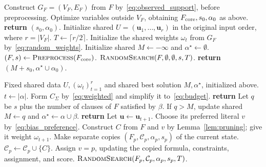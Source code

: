 \documentclass[11pt,a4paper]{article}
\theoremstyle{definition}
\theoremstyle{remark}
\begin{document}
\begin{algorithm}[H]
\caption{\textnormal{\textsc{RandomFormula}}$(F)$}\label{alg:weighted}
\begin{algorithmic}[1]
\STATE Construct $G_F=(V_F,E_F)$ from $F$ by~\eqref{eq:observed_support}, before preprocessing.
\STATE Optimize variables outside $V_F$, obtaining $F_{\rm core},s_0,\alpha_0$ as above.
  \STATE \textbf{return} $(s_0,\alpha_0)$.
\ENDIF
\STATE Initialize shared $U=(\mathbf u_1,\ldots,\mathbf u_r)$ in the original input order, where $r=|V_F|$.
\STATE $T\gets\lceil r/2\rceil$.
\STATE Initialize the shared weights $\omega_t$ from $G_F$ by~\eqref{eq:random_weights}.
\STATE Initialize shared $M\gets-\infty$ and $\alpha^\star\gets\emptyset$.
\STATE $(F,s)\gets\textnormal{\textsc{Preprocess}}(F_{\rm core})$.
\STATE $\textnormal{\textsc{RandomSearch}}(F,\emptyset,\emptyset,s,T)$.
\STATE \textbf{return} $(M+s_0,\alpha^\star\cup\alpha_0)$.
\end{algorithmic}
\end{algorithm}

\begin{algorithm}[H]
\caption{\textnormal{\textsc{RandomSearch}}$(F,\mathcal C,\alpha,s,T)$}
\label{alg:random_search}
\begin{algorithmic}[1]
\REQUIRE Fixed shared data $U,(\omega_t)_{t=1}^r$ and shared best solution $M,\alpha^\star$, initialized above.
\STATE $t\gets|\alpha|$.
\STATE Form $C_\Sigma$ by~\eqref{eq:weighted} and simplify it to~\eqref{eq:budget}.
  \STATE \textbf{return}
\ENDIF
{}
    \STATE Let $q$ be $s$ plus the number of clauses of $F$ satisfied by $\beta$.
    \STATE If $q>M$, update shared $M\gets q$ and $\alpha^\star\gets\alpha\cup\beta$.
  \ENDFOR
  \STATE \textbf{return}
\ENDIF
\STATE Let $\mathbf u\gets\mathbf u_{t+1}$.
\STATE Choose its preferred literal $v$ by~\eqref{eq:bias_preference}.
\STATE Construct $C$ from $F$ and $v$ by Lemma~\ref{lem:pruning}; give it weight $\omega_{t+1}$.
  \STATE Make separate copies $(F_p,\mathcal C_p,\alpha_p,s_p)$ of the current state.
    \STATE $\mathcal C_p\gets\mathcal C_p\cup\{C\}$.
  \ENDIF
  \STATE Assign $v=p$, updating the copied formula, constraints, assignment, and score.
  \STATE $\textnormal{\textsc{RandomSearch}}(F_p,\mathcal C_p,\alpha_p,s_p,T)$.
\ENDFOR
\end{algorithmic}
\end{algorithm}
\end{document}

